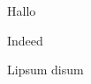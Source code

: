 \begin{strophe}
 Hallo
\end{strophe}
\begin{chorus}
 Indeed
\end{chorus}
\begin{strophe}
 Lipsum disum
\end{strophe}
\playchorus
{}